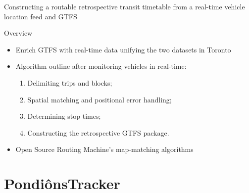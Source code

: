 \documentclass[xcolor=dvipsnames,table]{beamer}
\begin{document}
\begin{frame}{Constructing a routable retrospective transit timetable from a real-time vehicle location feed and GTFS}
        \begin{block}{Overview}
                \begin{itemize}
                        \item Enrich GTFS with real-time data unifying the two datasets in Toronto
                        \item Algorithm outline after monitoring vehicles in real-time:
                                \begin{enumerate}
                                        \item Delimiting trips and blocks;
                                        \item Spatial matching and positional error handling;
                                        \item Determining stop times;
                                        \item Constructing the retrospective GTFS package.
                                \end{enumerate}
                        \item Open Source Routing Machine's map-matching algorithms
                \end{itemize}

        \end{block}
\end{frame}

\section{PondiônsTracker}
\end{document}
